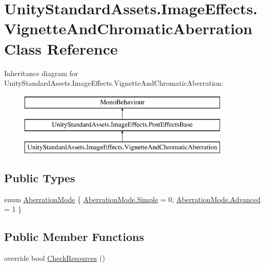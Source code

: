 \hypertarget{class_unity_standard_assets_1_1_image_effects_1_1_vignette_and_chromatic_aberration}{}\section{Unity\+Standard\+Assets.\+Image\+Effects.\+Vignette\+And\+Chromatic\+Aberration Class Reference}
\label{class_unity_standard_assets_1_1_image_effects_1_1_vignette_and_chromatic_aberration}
Inheritance diagram for Unity\+Standard\+Assets.\+Image\+Effects.\+Vignette\+And\+Chromatic\+Aberration\+:\begin{figure}[H]
\begin{center}
\leavevmode
\includegraphics[height=3.000000cm]{class_unity_standard_assets_1_1_image_effects_1_1_vignette_and_chromatic_aberration}
\end{center}
\end{figure}
\subsection*{Public Types}
\begin{DoxyCompactItemize}
\item 
enum \mbox{\hyperlink{class_unity_standard_assets_1_1_image_effects_1_1_vignette_and_chromatic_aberration_a10685d35dba29662e0f140819dbe2bf0}{Aberration\+Mode}} \{ \mbox{\hyperlink{class_unity_standard_assets_1_1_image_effects_1_1_vignette_and_chromatic_aberration_a10685d35dba29662e0f140819dbe2bf0a1fbb1e3943c2c6c560247ac8f9289780}{Aberration\+Mode.\+Simple}} = 0, 
\mbox{\hyperlink{class_unity_standard_assets_1_1_image_effects_1_1_vignette_and_chromatic_aberration_a10685d35dba29662e0f140819dbe2bf0a9b6545e4cea9b4ad4979d41bb9170e2b}{Aberration\+Mode.\+Advanced}} = 1
 \}
\end{DoxyCompactItemize}
\subsection*{Public Member Functions}
\begin{DoxyCompactItemize}
\item 
override bool \mbox{\hyperlink{class_unity_standard_assets_1_1_image_effects_1_1_vignette_and_chromatic_aberration_a7d939cec23cf992b53e3c17f0c730889}{Check\+Resources}} ()
\end{DoxyCompactItemize}
